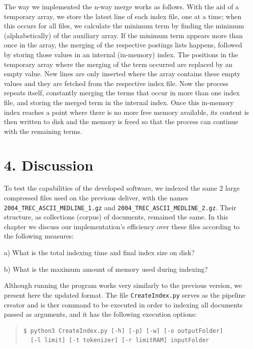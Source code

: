 \documentclass[12pt]{article}
\begin{document}
The way we implemented the n-way merge works as follows.
With the aid of a temporary array, we store the latest line of each index 
file, one at a time; when this occurs for all files, we calculate the 
minimum term by finding the minimum (alphabetically) of the auxiliary array. 
If the minimum term appears more than once in the array, the merging of the 
respective postings lists happens, followed by storing those values in an 
internal (in-memory) index.
The positions in the temporary array where the merging of the term occurred
are replaced by an empty value.
New lines are only inserted where the array contains these empty values and 
they are fetched from the respective index file.
Now the process repeats itself, constantly merging the terms that occur in 
more than one index file, and storing the merged term in the internal index.
Once this in-memory index reaches a point where there is no more free memory 
available, its content is then written to disk and the memory is freed so 
that the process can continue with the remaining terms.

\newpage
\section*{4. Discussion}

To test the capabilities of the developed software, we indexed the same
2 large compressed files used on the previous deliver, with the names 
\texttt{2004\_TREC\_ASCII\_MEDLINE\_1.gz} and 
\texttt{2004\_TREC\_ASCII\_MEDLINE\_2.gz}.
Their structure, as collections (corpus) of documents, remained the same.
In this chapter we discuss our implementation's efficiency over these 
files according to the following measures:

a) What is the total indexing time and final index size on disk?

b) What is the maximum amount of memory used during indexing?

Although running the program works very similarly to the previous version, we
present here the updated format.
The file \texttt{CreateIndex.py} serves as the pipeline creator and is ther command to be executed in order to 
indexing all documents passed as arguments, and it has the following execution options:

\begingroup
\addtolength\leftmargini{-0.4in}
\addtolength\baselineskip{-0.05in}
\begin{quote}
\begin{verbatim}
$ python3 CreateIndex.py [-h] [-p] [-w] [-o outputFolder] 
  [-l limit] [-t tokenizer] [-r limitRAM] inputFolder
\end{verbatim}
\end{quote}
\endgroup
\end{document}
